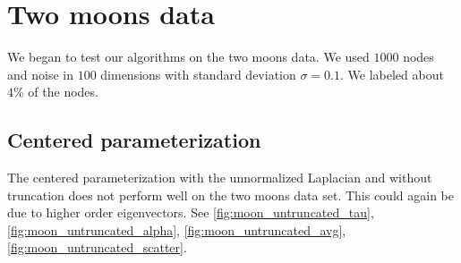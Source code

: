 \documentclass{siamart1116}
\begin{document}
\section{Two moons data}
We began to test our algorithms on the two moons data. We used $1000$ nodes and noise in $100$ dimensions with standard deviation $\sigma = 0.1$. We labeled about $4\%$ of the nodes.
\subsection{Centered parameterization}
The centered parameterization with the unnormalized Laplacian and without truncation does not perform well on the two moons data set. This could again be due to higher order eigenvectors. See \cref{fig:moon_untruncated_tau}, \cref{fig:moon_untruncated_alpha}, \cref{fig:moon_untruncated_avg}, \cref{fig:moon_untruncated_scatter}.
\end{document}

